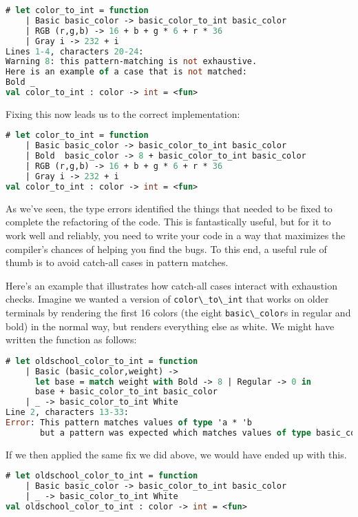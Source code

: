 \begin{lstlisting}[language=Caml]
# let color_to_int = function
    | Basic basic_color -> basic_color_to_int basic_color
    | RGB (r,g,b) -> 16 + b + g * 6 + r * 36
    | Gray i -> 232 + i
Lines 1-4, characters 20-24:
Warning 8: this pattern-matching is not exhaustive.
Here is an example of a case that is not matched:
Bold _
val color_to_int : color -> int = <fun>
\end{lstlisting}

Fixing this now leads us to the correct implementation:

\begin{lstlisting}[language=Caml]
# let color_to_int = function
    | Basic basic_color -> basic_color_to_int basic_color
    | Bold  basic_color -> 8 + basic_color_to_int basic_color
    | RGB (r,g,b) -> 16 + b + g * 6 + r * 36
    | Gray i -> 232 + i
val color_to_int : color -> int = <fun>
\end{lstlisting}

As we've seen, the type errors identified the things that needed to be
fixed to complete the refactoring of the code. This is fantastically
useful, but for it to work well and reliably, you need to write your
code in a way that maximizes the compiler's chances of helping you find
the bugs. To this end, a useful rule of thumb is to avoid catch-all
cases in pattern matches.

Here's an example that illustrates how catch-all cases interact with
exhaustion checks. Imagine we wanted a version of
\passthrough{\lstinline!color\_to\_int!} that works on older terminals
by rendering the first 16 colors (the eight
\passthrough{\lstinline!basic\_color!}s in regular and bold) in the
normal way, but renders everything else as white. We might have written
the function as follows: 

\begin{lstlisting}[language=Caml]
# let oldschool_color_to_int = function
    | Basic (basic_color,weight) ->
      let base = match weight with Bold -> 8 | Regular -> 0 in
      base + basic_color_to_int basic_color
    | _ -> basic_color_to_int White
Line 2, characters 13-33:
Error: This pattern matches values of type 'a * 'b
       but a pattern was expected which matches values of type basic_color
\end{lstlisting}

If we then applied the same fix we did above, we would have ended up
with this.

\begin{lstlisting}[language=Caml]
# let oldschool_color_to_int = function
    | Basic basic_color -> basic_color_to_int basic_color
    | _ -> basic_color_to_int White
val oldschool_color_to_int : color -> int = <fun>
\end{lstlisting}


